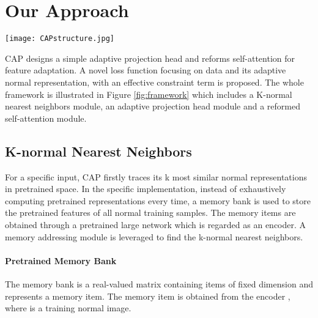 \documentclass{article}
\begin{document}
\section{Our Approach}
\begin{figure*}[h]
	\centering
		\texttt{[image: CAPstructure.jpg]}
	\caption{\textbf{Left}: The architecture of CAP contains a pretrained network, a K-normal nearest neighbors module, a simple adaptive projection head and a reformed self-attention module. Here, for a specific input,  is the pretrained feature,  is the adaptive feature and  is its corresponding adaptive normal representation. It should be noted that the two projection heads are weight-shared. \textbf{Right}: A toy example of CAP. In the pretrained space, the dots with light color are the input, and the deep ones are the normal training data. In the adaptive space, the distance between the anomaly and its adaptive normal representation is large.}
	\label{fig:framework}
\end{figure*}
CAP designs a simple adaptive projection head and reforms self-attention for feature adaptation. A novel loss function focusing on data and its adaptive normal representation, with an effective constraint term is proposed. The whole framework is illustrated in Figure \ref{fig:framework} which includes a K-normal nearest neighbors module, an adaptive projection head module and a reformed self-attention module.



\subsection{K-normal Nearest Neighbors}

For a specific input, CAP firstly traces its k most similar normal representations in pretrained space. In the specific implementation, instead of exhaustively computing pretrained representations every time, a memory bank is used to store the pretrained features of all normal training samples. The memory items are obtained through a pretrained large network  which is regarded as an encoder. A memory addressing module is leveraged to find the k-normal nearest neighbors.


\paragraph{Pretrained Memory Bank}
The memory bank  is a real-valued matrix containing  items of fixed dimension  and  represents a memory item. The memory item  is obtained from the encoder ,  where  is a training normal image.
\end{document}
